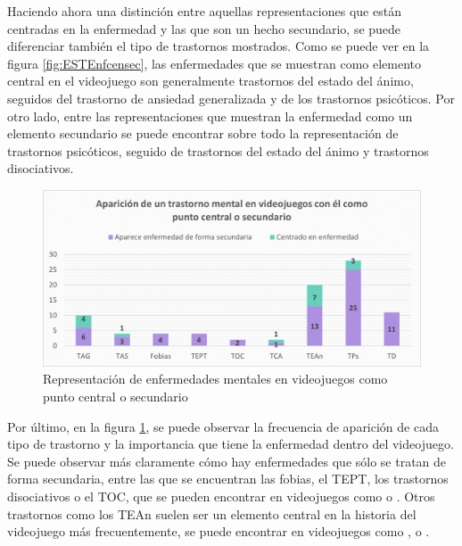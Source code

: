 \documentclass[12pt, a4paper,twoside,titlepage]{book}
\begin{document}
Haciendo ahora una distinción entre aquellas representaciones que están centradas en la enfermedad y las que son un hecho secundario, se puede diferenciar también el tipo de trastornos mostrados. Como se puede ver en la figura \ref{fig:ESTEnfcensec}, las enfermedades que se muestran como elemento central en el videojuego son generalmente trastornos del estado del ánimo, seguidos del trastorno de ansiedad generalizada y de los trastornos psicóticos. Por otro lado, entre las representaciones que muestran la enfermedad como un elemento secundario se puede encontrar sobre todo la representación de trastornos psicóticos, seguido de trastornos del estado del ánimo y trastornos disociativos. 



\begin{figure}
    \centering
    \includegraphics[width=1\linewidth]{Graficas estudio/G6; Enfcentralsecund.png}
    \caption{Representación de enfermedades mentales en videojuegos como punto central o secundario}
    \label{fig:ESTEnfvidcensec}
\end{figure}


    
Por último, en la figura \ref{fig:ESTEnfvidcensec}, se puede observar la frecuencia de aparición de cada tipo de trastorno y la importancia que tiene la enfermedad dentro del videojuego. Se puede observar más claramente cómo hay enfermedades que sólo se tratan de forma secundaria, entre las que se encuentran las fobias, el TEPT, los trastornos disociativos o el TOC, que se pueden encontrar en videojuegos como  o  . Otros trastornos como los TEAn suelen ser un elemento central en la historia del videojuego más frecuentemente, se puede encontrar en videojuegos como ,  o . 
\end{document}
